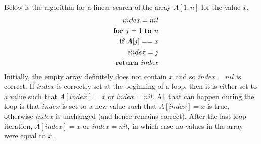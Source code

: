 \subsubsection{}
    Below is the algorithm for a linear search of the array $A[1:n]$ for the value $x$.
    \begin{eqnarray}
        &\,& index = nil
        \\ \nonumber &\,& \text{\bf for } j = 1 \text{ \bf to } n
        \\ \nonumber &\,& \quad \text{\bf if } A[j] == x
        \\ \nonumber &\,& \qquad index = j
        \\ \nonumber &\,& \text{\bf return } index
    \end{eqnarray}
    Initially, the empty array definitely does not contain $x$ and so $index=nil$ is correct.  If $index$ is correctly set at the beginning of a loop, then it is either set to a value such that $A[index] = x$ or $index = nil$.  All that can happen during the loop is that $index$ is set to a new value such that $A[index] = x$ is true, otherwise $index$ is unchanged (and hence remains correct).  After the last loop iteration, $A[index] = x$ or $index = nil$, in which case no values in the array were equal to $x$.

